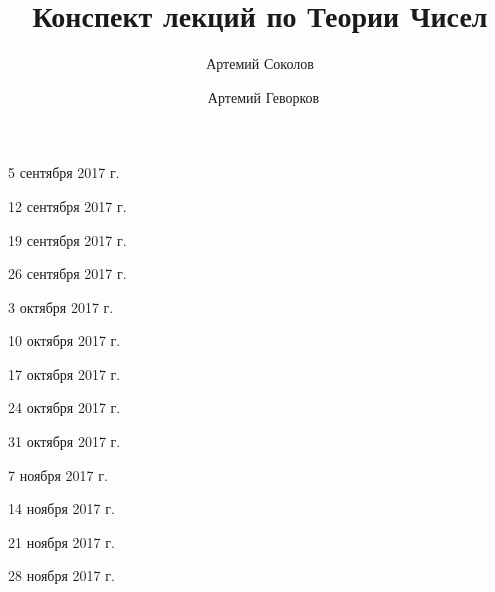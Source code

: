 \documentclass[%
  a4paper,%
  titlepage,%
  11pt%
]{article}%
\title{Конспект лекций по Теории Чисел}
\author{Артемий Соколов \and~Артемий Геворков}
\begin{document}
    
    
    \tableofcontents
    \newpage

    \pagestyle{fancy}

    \begin{lecture}{5 сентября 2017 г.}
        
    \end{lecture}

    \begin{lecture}{12 сентября 2017 г.}
        
    \end{lecture}

    \begin{lecture}{19 сентября 2017 г.}
        
    \end{lecture}

    \begin{lecture}{26 сентября 2017 г.}
        
    \end{lecture}

    \begin{lecture}{3 октября 2017 г.}
        
    \end{lecture}

    \begin{lecture}{10 октября 2017 г.}
        
    \end{lecture}

    \begin{lecture}{17 октября 2017 г.}
        
    \end{lecture}

    \begin{lecture}{24 октября 2017 г.}
        
    \end{lecture}

    \begin{lecture}{31 октября 2017 г.}
        
    \end{lecture}

    \begin{lecture}{7 ноября 2017 г.}
        
    \end{lecture}

    \begin{lecture}{14 ноября 2017 г.}
        
    \end{lecture}

    \begin{lecture}{21 ноября 2017 г.}
        
    \end{lecture}

    \begin{lecture}{28 ноября 2017 г.}
        
    \end{lecture}
\end{document}
